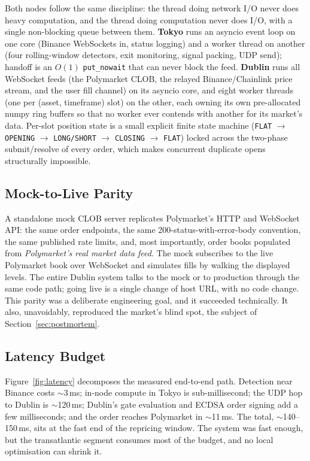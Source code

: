 \documentclass{tmsce}
\begin{document}
Both nodes follow the same discipline: the thread doing network I/O never does heavy
computation, and the thread doing computation never does I/O, with a single
non-blocking queue between them. \textbf{Tokyo} runs an asyncio event loop on one
core (Binance WebSockets in, status logging) and a worker thread on another (four
rolling-window detectors, exit monitoring, signal packing, UDP send); handoff is an
$O(1)$ \texttt{put\_nowait} that can never block the feed. \textbf{Dublin} runs all
WebSocket feeds (the Polymarket CLOB, the relayed Binance/Chainlink price stream,
and the user fill channel) on its asyncio core, and eight worker threads (one per
(asset, timeframe) slot) on the other, each owning its own pre-allocated numpy ring
buffers so that no worker ever contends with another for its market's data. Per-slot
position state is a small explicit finite state machine
(\texttt{FLAT} $\rightarrow$ \texttt{OPENING} $\rightarrow$ \texttt{LONG/SHORT}
$\rightarrow$ \texttt{CLOSING} $\rightarrow$ \texttt{FLAT}) locked across the
two-phase submit/resolve of every order, which makes concurrent duplicate opens
structurally impossible.

\subsection{Mock-to-Live Parity}

A standalone mock CLOB server replicates Polymarket's HTTP and WebSocket API: the
same order endpoints, the same 200-status-with-error-body convention, the same
published rate limits, and, most importantly, order books populated from
\emph{Polymarket's real market data feed}. The mock subscribes to the live
Polymarket book over WebSocket and simulates fills by walking the displayed levels.
The entire Dublin system talks to the mock or to production through the same code
path; going live is a single change of host URL, with no code change. This parity
was a deliberate engineering goal, and it succeeded technically. It also,
unavoidably, reproduced the market's blind spot, the subject of
Section~\ref{sec:postmortem}.

\subsection{Latency Budget}

Figure~\ref{fig:latency} decomposes the measured end-to-end path. Detection near
Binance costs $\sim$3\,ms; in-node compute in Tokyo is sub-millisecond; the UDP hop
to Dublin is $\sim$120\,ms; Dublin's gate evaluation and ECDSA order signing add a
few milliseconds; and the order reaches Polymarket in $\sim$11\,ms. The total,
$\sim$140--150\,ms, sits at the fast end of the repricing window. The system was
fast enough, but the transatlantic segment consumes most of the budget, and no local
optimisation can shrink it.
\end{document}
